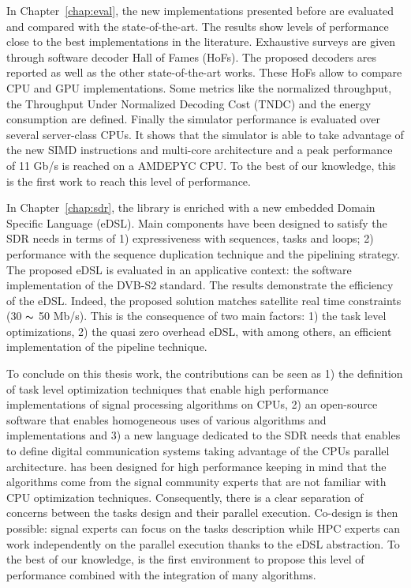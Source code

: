 In Chapter~\ref{chap:eval}, the new implementations presented before are
evaluated and compared with the state-of-the-art. The results show levels of
performance close to the best implementations in the literature. Exhaustive
surveys are given through software decoder Hall of Fames (HoFs). The proposed
decoders ares reported as well as the other state-of-the-art works. These HoFs
allow to compare CPU and GPU implementations. Some metrics like the normalized
throughput, the Throughput Under Normalized Decoding Cost (TNDC) and the energy
consumption are defined. Finally the \AFFECT simulator performance is evaluated
over several server-class CPUs. It shows that the simulator is able to take
advantage of the new SIMD instructions and multi-core architecture and a peak
performance of 11 Gb/s is reached on a AMD\R EPYC CPU. To the best of our
knowledge, this is the first work to reach this level of performance.

In Chapter~\ref{chap:sdr}, the \AFFECT library is enriched with a new embedded
Domain Specific Language (eDSL). Main components have been designed to satisfy
the SDR needs in terms of 1) expressiveness with sequences, tasks and loops; 2)
performance with the sequence duplication technique and the pipelining strategy.
The proposed eDSL is evaluated in an applicative context: the software
implementation of the DVB-S2 standard. The results demonstrate the efficiency of
the \AFFECT eDSL. Indeed, the proposed solution matches satellite real time
constraints (30 $\thicksim$ 50 Mb/s). This is the consequence of two main
factors: 1) the task level optimizations, 2) the quasi zero overhead eDSL, with
among others, an efficient implementation of the pipeline technique.

To conclude on this thesis work, the contributions can be seen as 1) the
definition of task level optimization techniques that enable high performance
implementations of signal processing algorithms on CPUs, 2) an open-source
software that enables homogeneous uses of various algorithms and implementations
and 3) a new language dedicated to the SDR needs that enables to define digital
communication systems taking advantage of the CPUs parallel architecture.
\AFFECT has been designed for high performance keeping in mind that the
algorithms come from the signal community experts that are not familiar with CPU
optimization techniques. Consequently, there is a clear separation of concerns
between the tasks design and their parallel execution. Co-design is then
possible: signal experts can focus on the tasks description while HPC experts
can work independently on the parallel execution thanks to the eDSL abstraction.
To the best of our knowledge, \AFFECT is the first environment to propose this
level of performance combined with the integration of many algorithms.

